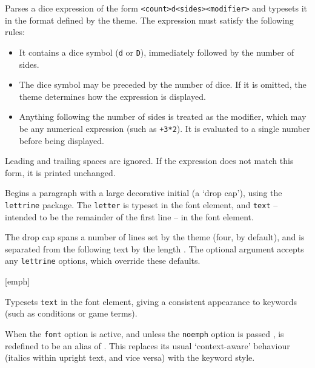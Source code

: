 		{
			Parses a dice expression of the form \texttt{<count>d<sides><modifier>} and typesets it in the format defined by the theme. The expression must satisfy the following rules:
			\begin{itemize}
				\item It contains a dice symbol (\texttt{d} or \texttt{D}), immediately followed by the number of sides.
				\item The dice symbol may be preceded by the number of dice. If it is omitted, the theme determines how the expression is displayed.
				\item Anything following the number of sides is treated as the modifier, which may be any numerical expression (such as \texttt{+3*2}). It is evaluated to a single number before being displayed.
			\end{itemize}
			Leading and trailing spaces are ignored. If the expression does not match this form, it is printed unchanged.

		}
		{
			Begins a paragraph with a large decorative initial (a `drop cap'), using the \texttt{lettrine} package. The \texttt{letter} is typeset in the  font element, and \texttt{text} -- intended to be the remainder of the first line -- in the  font element.

			The drop cap spans a number of lines set by the theme (four, by default), and is separated from the following text by the length . The optional argument accepts any \texttt{lettrine} options, which override these defaults.


		}
		{}
		{
			Typesets \texttt{text} in the  font element, giving a consistent appearance to keywords (such as conditions or game terms).

			When the \texttt{font} option is active, and unless the \texttt{noemph} option is passed ,  is redefined to be an alias of . This replaces its usual `context-aware' behaviour (italics within upright text, and vice versa) with the keyword style.

		}

